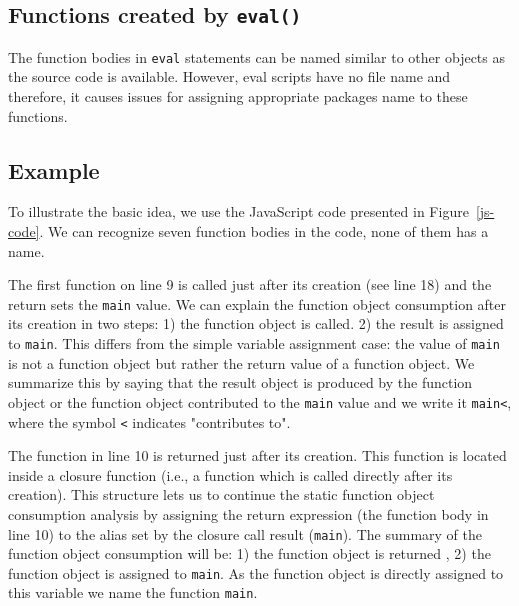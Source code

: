 \documentclass[10pt, preprint]{sigplanconf}
\begin{document}
\subsection{Functions created by {\large \texttt{eval()}}}
The function bodies in {\small\texttt{eval}} statements can be named similar to other objects as the source code is available. However, eval scripts have no file name and therefore, it causes issues for assigning appropriate packages name to these functions. 



\subsection{Example}
  
To illustrate the basic idea, we use the JavaScript code presented in Figure~\ref{js-code}. We can recognize seven function bodies in the code, none of them has a name. 

The first function on line 9 is called just after its creation (see line 18) and the return sets the {\small\texttt{main}} value. We can explain the function object consumption after its creation in two steps: 1) the function object is called. 2) the result is assigned to {\small\texttt{main}}. This differs from the simple variable assignment case: the value of {\small\texttt{main}} is not a function object but rather the return value of a function object.   We summarize this by saying that the result object is produced by the function object or the function object contributed to the {\small\texttt{main}} value and we write it {\small\texttt{main<}}, where the symbol {\small\texttt{<}} indicates "contributes to".

The function in line 10 is returned just after its creation. This function is located inside a closure function (i.e., a function which is called directly after its creation). This structure lets us to continue the static function object consumption analysis by assigning the return expression (the function body in line 10) to the alias set by the closure call result ({\small\texttt{main}}). The summary of the function object consumption will be: 1) the function object is returned , 2) the function object is assigned to {\small\texttt{main}}. As the function object is directly assigned to this variable we name the function {\small\texttt{main}}.
\end{document}

